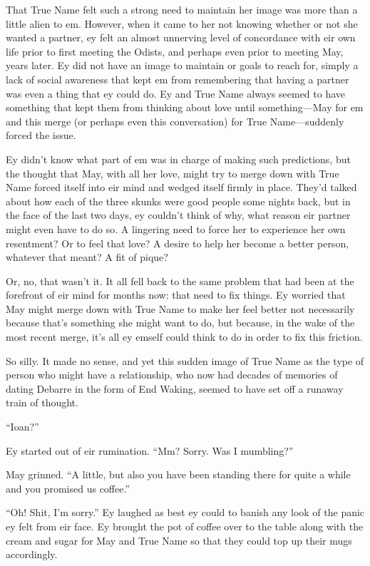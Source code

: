 That True Name felt such a strong need to maintain her image was more than a little alien to em. However, when it came to her not knowing whether or not she wanted a partner, ey felt an almost unnerving level of concordance with eir own life prior to first meeting the Odists, and perhaps even prior to meeting May, years later. Ey did not have an image to maintain or goals to reach for, simply a lack of social awareness that kept em from remembering that having a partner was even a thing that ey could do. Ey and True Name always seemed to have something that kept them from thinking about love until something—May for em and this merge (or perhaps even this conversation) for True Name—suddenly forced the issue.

Ey didn't know what part of em was in charge of making such predictions, but the thought that May, with all her love, might try to merge down with True Name forced itself into eir mind and wedged itself firmly in place. They'd talked about how each of the three skunks were good people some nights back, but in the face of the last two days, ey couldn't think of why, what reason eir partner might even have to do so. A lingering need to force her to experience her own resentment? Or to feel that love? A desire to help her become a better person, whatever that meant? A fit of pique?

Or, no, that wasn't it. It all fell back to the same problem that had been at the forefront of eir mind for months now: that need to fix things. Ey worried that May might merge down with True Name to make her feel better not necessarily because that's something she might want to do, but because, in the wake of the most recent merge, it's all ey emself could think to do in order to fix this friction.

So silly. It made no sense, and yet this sudden image of True Name as the type of person who might have a relationship, who now had decades of memories of dating Debarre in the form of End Waking, seemed to have set off a runaway train of thought.

``Ioan?''

Ey started out of eir rumination. ``Mm? Sorry. Was I mumbling?''

May grinned. ``A little, but also you have been standing there for quite a while and you promised us coffee.''

``Oh! Shit, I'm sorry.'' Ey laughed as best ey could to banish any look of the panic ey felt from eir face. Ey brought the pot of coffee over to the table along with the cream and sugar for May and True Name so that they could top up their mugs accordingly.

